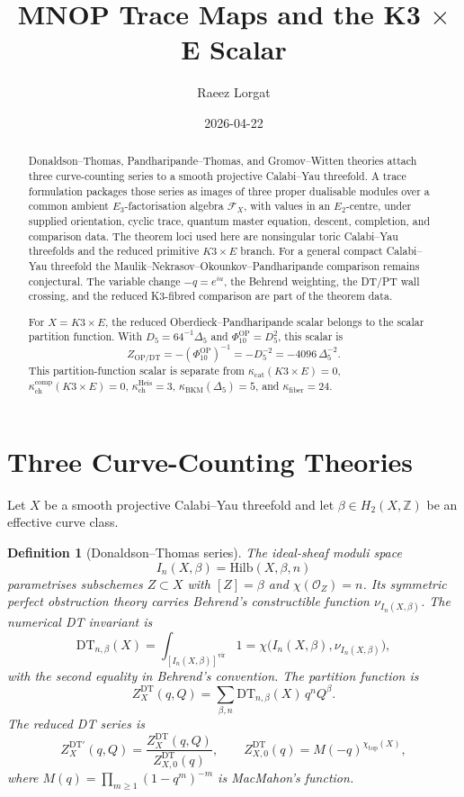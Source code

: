 \documentclass[11pt]{article}
\title{MNOP Trace Maps and the K3 \(\times\) E Scalar}
\author{Raeez Lorgat}
\date{2026-04-22}
\newtheorem{definition}[theorem]{Definition}
\providecommand{\ZZ}{\mathbb{Z}}
\providecommand{\cO}{\mathcal{O}}
\providecommand{\cF}{\mathcal{F}}
\providecommand{\Hilb}{\mathrm{Hilb}}
\providecommand{\DT}{\mathrm{DT}}
\providecommand{\vir}{\mathrm{vir}}
\providecommand{\kchcomp}{\kappa_{\mathrm{ch}}^{\mathrm{comp}}}
\providecommand{\kchHeis}{\kappa_{\mathrm{ch}}^{\mathrm{Heis}}}
\providecommand{\kcat}{\kappa_{\mathrm{cat}}}
\providecommand{\kBKM}{\kappa_{\mathrm{BKM}}}
\providecommand{\kfib}{\kappa_{\mathrm{fiber}}}
\providecommand{\Etwo}{E_2}
\providecommand{\Ethree}{E_3}
\providecommand{\DeltaFive}{\Delta_5}
\providecommand{\PhiTen}{\Phi_{10}}
\providecommand{\Dfive}{D_5}
\begin{document}
\maketitle

\begin{abstract}
Donaldson--Thomas, Pandharipande--Thomas, and Gromov--Witten
theories attach three curve-counting series to a smooth projective
Calabi--Yau threefold.  A trace formulation packages those series as
images of three proper dualisable modules over a common ambient
\(\Ethree\)-factorisation algebra \(\cF_X\), with values in an
\(\Etwo\)-centre, under supplied orientation, cyclic trace, quantum
master equation, descent, completion, and comparison data.  The theorem
loci used here are nonsingular toric Calabi--Yau threefolds and the
reduced primitive \(K3\times E\) branch.  For a general compact
Calabi--Yau threefold the Maulik--Nekrasov--Okounkov--Pandharipande
comparison remains conjectural.  The variable change \(-q=e^{iu}\),
the Behrend weighting, the DT/PT wall crossing, and the reduced
K3-fibred comparison are part of the theorem data.

For \(X=K3\times E\), the reduced Oberdieck--Pandharipande scalar
belongs to the scalar partition function.  With
\(\Dfive=64^{-1}\DeltaFive\) and
\(\PhiTen^{\mathrm{OP}}=\Dfive^2\), this scalar is
\[
  Z_{\mathrm{OP/DT}}
  =-(\PhiTen^{\mathrm{OP}})^{-1}
  =-\Dfive^{-2}
  =-4096\,\DeltaFive^{-2}.
\]
This partition-function scalar is separate from
\(\kcat(K3\times E)=0\), \(\kchcomp(K3\times E)=0\),
\(\kchHeis=3\), \(\kBKM(\DeltaFive)=5\), and \(\kfib=24\).
\end{abstract}

\tableofcontents

\section{Three Curve-Counting Theories}

Let \(X\) be a smooth projective Calabi--Yau threefold and let
\(\beta\in H_2(X,\ZZ)\) be an effective curve class.

\begin{definition}[Donaldson--Thomas series]
The ideal-sheaf moduli space
\[
  I_n(X,\beta)=\Hilb(X,\beta,n)
\]
parametrises subschemes \(Z\subset X\) with
\([Z]=\beta\) and \(\chi(\cO_Z)=n\).  Its symmetric perfect
obstruction theory carries Behrend's constructible function
\(\nu_{I_n(X,\beta)}\).  The numerical DT invariant is
\[
  \DT_{n,\beta}(X)
  =
  \int_{[I_n(X,\beta)]^{\vir}}1
  =
  \chi\bigl(I_n(X,\beta),\nu_{I_n(X,\beta)}\bigr),
\]
with the second equality in Behrend's convention.  The partition
function is
\[
  Z_X^{\DT}(q,Q)
  =
  \sum_{\beta,n}\DT_{n,\beta}(X)\,q^n Q^\beta .
\]
The reduced DT series is
\[
  Z_X^{\DT\prime}(q,Q)
  =
  \frac{Z_X^{\DT}(q,Q)}
       {Z_{X,0}^{\DT}(q)},
  \qquad
  Z_{X,0}^{\DT}(q)=M(-q)^{\chi_{\mathrm{top}}(X)},
\]
where \(M(q)=\prod_{m\geq 1}(1-q^m)^{-m}\) is MacMahon's function.
\end{definition}
\end{document}
